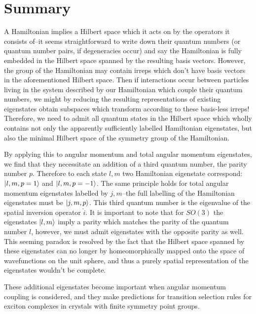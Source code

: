 \documentclass[12pt]{article}
\begin{document}
	\section{Summary}
	
	A Hamiltonian implies a Hilbert space which it acts on by the operators it consists of--it seems straightforward to write down their quantum numbers (or quantum number pairs, if degeneracies occur) and say the Hamiltonian is fully embedded in the Hilbert space spanned by the resulting basis vectors. However, the group of the Hamiltonian may contain irreps which don't have basis vectors in the aforementioned Hilbert space. Then if interactions occur between particles living in the system described by our Hamiltonian which couple their quantum numbers, we might by reducing the resulting representations of existing eigenstates obtain subspaces which transform according to these basis-less irreps! Therefore, we need to admit all quantum states in the Hilbert space which wholly contains not only the apparently sufficiently labelled Hamiltonian eigenstates, but also the minimal Hilbert space of the symmetry group of the Hamiltonian.
	
	By applying this to angular momentum and total angular momentum eigenstates, we find that they necessitate an addition of a third quantum number, the parity number $p$. Therefore to each state $l,m$ two Hamiltonian eigenstate correspond: $\ket{l,m,p=1}$ and $\ket{l,m,p=-1}$. The same principle holds for total angular momentum eigenstates labelled by $j,m$--the full labelling of the Hamiltonian eigenstates must be $\ket{j,m,p}$. This third quantum number is the eigenvalue of the spatial inversion operator $\hat{i}$. It is important to note that for $SO(3)$ the eigenstates $\ket{l,m}$ imply a parity which matches the parity of the quantum number $l$, however, we must admit eigenstates with the opposite parity as well. This seeming paradox is resolved by the fact that the Hilbert space spanned by these eigenstates can no longer by homeomorphically mapped onto the space of wavefunctions on the unit sphere, and thus a purely spatial representation of the eigenstates wouldn't be complete.
	
	These additional eigenstates become important when angular momentum coupling is considered, and they make predictions for transition selection rules for exciton complexes in crystals with finite symmetry point groups.
	
\end{document}
